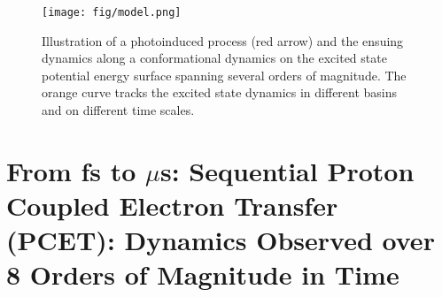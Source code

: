 \documentclass[journal=jacsat,manuscript=article]{achemso}
\begin{document}
\begin{figure}[t]
\centering
\texttt{[image: fig/model.png]}
\caption{Illustration of a photoinduced process (red arrow) and the
  ensuing dynamics along a conformational dynamics on the excited
  state potential energy surface spanning several orders of
  magnitude. The orange curve tracks the excited state dynamics in
  different basins and on different time scales.}
\label{fig:model}
\end{figure}





\section{From fs to $\mu$s:
  Sequential Proton Coupled Electron Transfer (PCET): Dynamics
  Observed over 8 Orders of Magnitude in Time}
\end{document}
